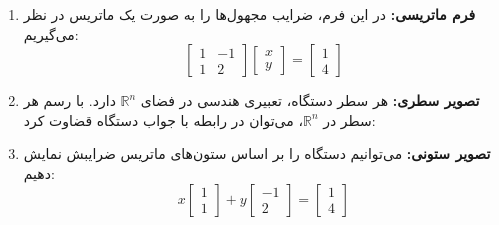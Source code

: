 \begin{enumerate}
\item
\textbf{فرم ماتریسی:} در این فرم، ضرایب مجهول‌ها را به صورت یک ماتریس در نظر می‌گیریم:
\begin{equation}
{
	\begin{bmatrix}
	1 & -1\\
	1 & 2
	\end{bmatrix}}
{\begin{bmatrix}
	x\\
	y
	\end{bmatrix}}= 
{\begin{bmatrix}
	1\\
	4
	\end{bmatrix}}
\end{equation}

\item
\textbf{تصویر سطری:} هر سطر دستگاه، تعبیری هندسی در فضای $\mathbb{R}^n$ دارد. با رسم هر سطر در $\mathbb{R}^n$، می‌توان در رابطه با جواب دستگاه قضاوت کرد:

\begin{center}
\end{center}

\item
\textbf{تصویر ستونی:} می‌توانیم دستگاه را بر اساس ستون‌های ماتریس ضرایبش نمایش دهیم:
\begin{equation}
{x \begin{bmatrix}
	1\\
	1
	\end{bmatrix}+
	y \begin{bmatrix}
	-1\\
	2
	\end{bmatrix}}
=
\begin{bmatrix}
1\\
4
\end{bmatrix} 	
\end{equation}


\end{enumerate}
